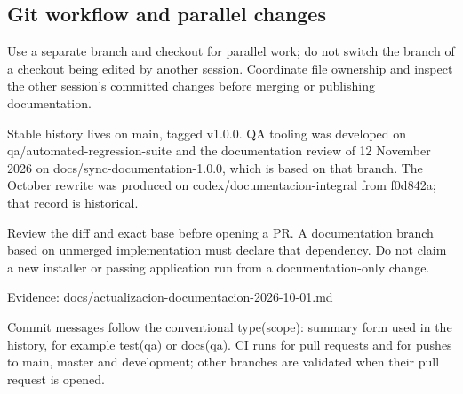 \subsection{Git workflow and parallel changes}

Use a separate branch and checkout for parallel work; do not switch the branch of a checkout being edited by another session. Coordinate file ownership and inspect the other session's committed changes before merging or publishing documentation.

Stable history lives on main, tagged v1.0.0. QA tooling was developed on qa/automated-regression-suite and the documentation review of 12 November 2026 on docs/sync-documentation-1.0.0, which is based on that branch. The October rewrite was produced on codex/documentacion-integral from f0d842a; that record is historical.

Review the diff and exact base before opening a PR. A documentation branch based on unmerged implementation must declare that dependency. Do not claim a new installer or passing application run from a documentation-only change.

Evidence: docs/actualizacion-documentacion-2026-10-01.md

Commit messages follow the conventional type(scope): summary form used in the history, for example test(qa) or docs(qa). CI runs for pull requests and for pushes to main, master and development; other branches are validated when their pull request is opened.

